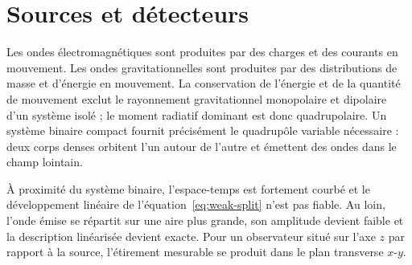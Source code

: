 \begin{classroomqa}
\end{classroomqa}

\section{Sources et détecteurs}

Les ondes électromagnétiques sont produites par des charges et des courants en mouvement. Les ondes gravitationnelles sont produites par des distributions de masse et d’énergie en mouvement. La conservation de l’énergie et de la quantité de mouvement exclut le rayonnement gravitationnel monopolaire et dipolaire d’un système isolé ; le moment radiatif dominant est donc quadrupolaire. Un système binaire compact fournit précisément le quadrupôle variable nécessaire : deux corps denses orbitent l’un autour de l’autre et émettent des ondes dans le champ lointain.

À proximité du système binaire, l’espace-temps est fortement courbé et le développement linéaire de l’équation~\eqref{eq:weak-split} n’est pas fiable. Au loin, l’onde émise se répartit sur une aire plus grande, son amplitude devient faible et la description linéarisée devient exacte. Pour un observateur situé sur l’axe \(z\) par rapport à la source, l’étirement mesurable se produit dans le plan transverse \(x\)-\(y\).

\begin{classroomqa}
\end{classroomqa}

